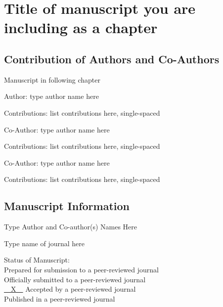 
\chapter{Title of manuscript you are\\ including as a chapter}\label{CH:manuscript}

\section{Contribution of Authors and Co-Authors}

\noindent Manuscript in following chapter

\noindent Author: type author name here

\begin{singlespace}
  \noindent Contributions: list contributions here, single-spaced
\end{singlespace}

\noindent Co-Author: type author name here

\begin{singlespace}
  \noindent Contributions: list contributions here, single-spaced
\end{singlespace}

\noindent Co-Author: type author name here

\begin{singlespace}
  \noindent Contributions: list contributions here, single-spaced
\end{singlespace}


\newpage

\section{Manuscript Information}

\noindent Type Author and Co-author(s) Names Here

\noindent Type name of journal here

\begin{singlespace}
  \noindent Status of Manuscript: \\ %
  \underline{\phantom{~~X~~}} Prepared for submission to a peer-reviewed journal\\
  \underline{\phantom{~~X~~}} Officially submitted to a peer-reviewed journal\\
  \underline{~~X~~} Accepted by a peer-reviewed journal\\
  \underline{\phantom{~~X~~}} Published in a peer-reviewed journal
\end{singlespace}


